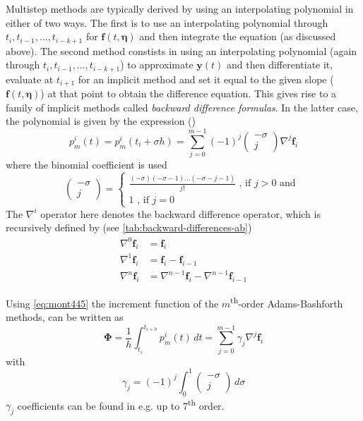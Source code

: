 Multistep methods are typically derived by using an interpolating polynomial in
either of two ways. The first is to use an interpolating polynomial through 
$t_i, t_{i-1}, \dots , t_{i-k+1}$ for $\bm{f}(t, \bm{\eta})$ and then integrate 
the equation (as discussed above). The second method constists in using an 
interpolating polynomial (again through $t_i, t_{i-1}, \dots , t_{i-k+1}$) to 
approximate $\bm{y}(t)$ and then differentiate it, evaluate at $t_{i+1}$ for an 
implicit method and set it equal to the given slope ($\bm{f}(t, \bm{\eta})$) at 
that point to obtain the difference equation. This gives rise to a family of 
implicit methods called \emph{backward difference formulas}. In the latter case, 
the polynomial is given by the expression (\cite{Montenbruck2000})
\begin{equation}\label{eq:mont451}
    p^{i}_{m}(t) = p^{i}_{m}(t_i + \sigma h) = \sum_{j=0}^{m-1} \left(-1\right)^j 
        \begin{pmatrix}-\sigma \\ j \end{pmatrix} \nabla ^j \bm{f}_i
\end{equation}
where the binomial coefficient is used
\begin{equation}
    \begin{pmatrix}-\sigma \\ j \end{pmatrix} = 
        \begin{cases}
            \frac{(-\sigma)(-\sigma -1)\dots (-\sigma -j -1)}{j!} \text{ , if } j>0 \text{ and } \\
            1  \text{ , if } j=0
        \end{cases}
\end{equation}
The $\nabla ^i$ operator here denotes the backward difference operator, which is 
recursively defined by (see \autoref{tab:backward-differences-ab})
\begin{equation}
    \begin{aligned}
        \nabla ^0 \bm{f}_i &= \bm{f}_i \\
        \nabla ^1 \bm{f}_i &= \bm{f}_i - \bm{f}_{i-1} \\
        \nabla ^n \bm{f}_i &= \nabla ^{n-1}\bm{f}_i - \nabla ^{n-1} \bm{f}_{i-1}
    \end{aligned}
\end{equation}

Using \autoref{eq:mont445} the increment function of the $m$\textsuperscript{th}-order 
Adams-Bashforth methods, can be written as
\begin{equation}\label{eq:mont454}
    \bm{\Phi} = \frac{1}{h} \int_{t_i}^{t_{i+h}} p^{i}_{m}(t) \,dt 
        = \sum_{j=0}^{m-1} \gamma _j \nabla ^j \bm{f}_i
\end{equation}
with 
\begin{equation}\label{eq:mont455}
    \gamma _j = \left( -1 \right)^j \int_{0}^{1} \begin{pmatrix}-\sigma \\ j \end{pmatrix} \,d\sigma
\end{equation}
$\gamma _j$ coefficients can be found in e.g. \cite{Butcher2016} up to 
7\textsuperscript{th} order.

